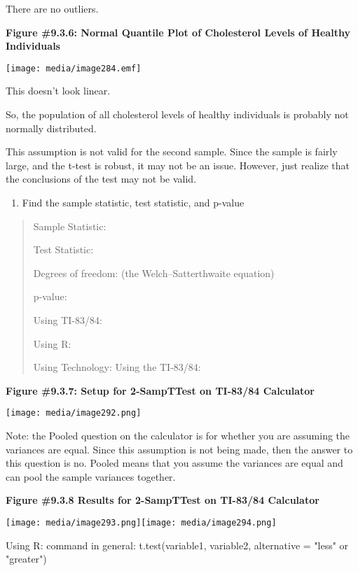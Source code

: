 \documentclass[]{book}
\providecommand{\tightlist}{%
  \setlength{\itemsep}{0pt}\setlength{\parskip}{0pt}}
\begin{document}
\begin{enumerate}
  There are no outliers.

  \textbf{Figure \#9.3.6: Normal Quantile Plot of Cholesterol Levels of
  Healthy Individuals}

  \texttt{[image: media/image284.emf]}

  This doesn't look linear.

  So, the population of all cholesterol levels of healthy individuals
  is probably not normally distributed.

  This assumption is not valid for the second sample. Since the sample
  is fairly large, and the t-test is robust, it may not be an issue.
  However, just realize that the conclusions of the test may not be
  valid.
\end{enumerate}

\begin{enumerate}
\def\labelenumi{\arabic{enumi}.}
\setcounter{enumi}{3}
\tightlist
\item
  Find the sample statistic, test statistic, and p-value
\end{enumerate}

\begin{quote}
Sample Statistic:

Test Statistic:

Degrees of freedom: (the Welch--Satterthwaite equation)

p-value:

Using TI-83/84:

Using R:

Using Technology: Using the TI-83/84:
\end{quote}

\textbf{Figure \#9.3.7: Setup for 2-SampTTest on TI-83/84 Calculator}

\texttt{[image: media/image292.png]}

Note: the Pooled question on the calculator is for whether you are assuming the variances are equal. Since this assumption is not being made, then the answer to this question is no. Pooled means that you assume the variances are equal and can pool the sample variances together.

\textbf{Figure \#9.3.8 Results for 2-SampTTest on TI-83/84 Calculator}

\texttt{[image: media/image293.png]}\texttt{[image: media/image294.png]}

Using R: command in general: t.test(variable1, variable2, alternative =
"less" or "greater")
\end{document}
